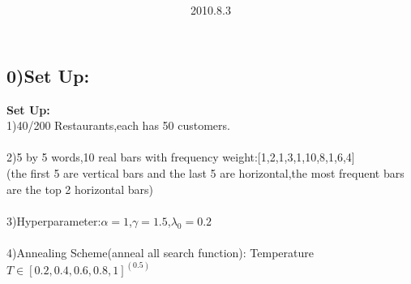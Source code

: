 \documentclass{article}
\title{\vspace{0.3in}\textmd{\textbf{\hmwkTitle}}}
\date{2010.8.3}
\author{\textbf{\hmwkAuthorName}}
\begin{document}
\begin{spacing}{1.1}
\maketitle

\section{0)Set Up:}
{\bf Set Up:}\\
1)40/200 Restaurants,each has 50 customers.\\ \\
2)5 by 5 words,10 real bars with frequency weight:[1,2,1,3,1,10,8,1,6,4]\\ 
(the first 5 are vertical bars and the last 5 are horizontal,the most frequent bars are the top 2 horizontal bars)\\\\
3)Hyperparameter:$\alpha=1$,$\gamma=1.5$,$\lambda_{0}=0.2$\\ \\
4)Annealing Scheme(anneal all search function): Temperature $T\in[0.2,0.4,0.6,0.8,1]^{(0.5)}$\\ 


\end{spacing}
\end{document}
